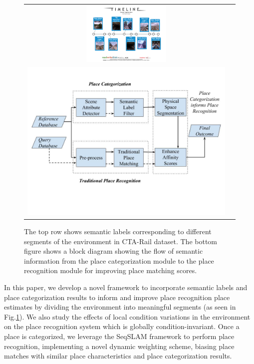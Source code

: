 \documentclass[letterpaper, 10 pt, conference]{ieeeconf}  %
\begin{document}
\begin{figure}
\centering
\begin{tabular}{cc}
	\includegraphics[clip, trim=2cm 4cm 2cm 4cm,width=6.5cm,height=3.0cm]{cta-dataset-segmentation-1}\\
	
	\includegraphics[clip, trim=0cm 4cm 0cm 2cm,scale=0.2]{flowchart}
\end{tabular}
	\caption{ The top row shows semantic labels corresponding to different segments of the environment in CTA-Rail dataset. The bottom figure shows a block diagram showing the flow of semantic information from the place categorization module to the place recognition module for improving place matching scores.}
	\label{fig:flowchart}
\end{figure}


In this paper, we develop a novel framework to incorporate semantic labels and place categorization results to inform and improve place recognition place estimates by dividing the environment into meaningful segments (as seen in Fig.\ref{fig:flowchart}). We also study the effects of local condition variations in the environment on the place recognition system which is globally condition-invariant. Once a place is categorized, we leverage the SeqSLAM \cite{Milford2012} framework to perform place recognition, implementing a novel dynamic weighting scheme, biasing place matches with similar place characteristics and place categorization results. 
\end{document}
